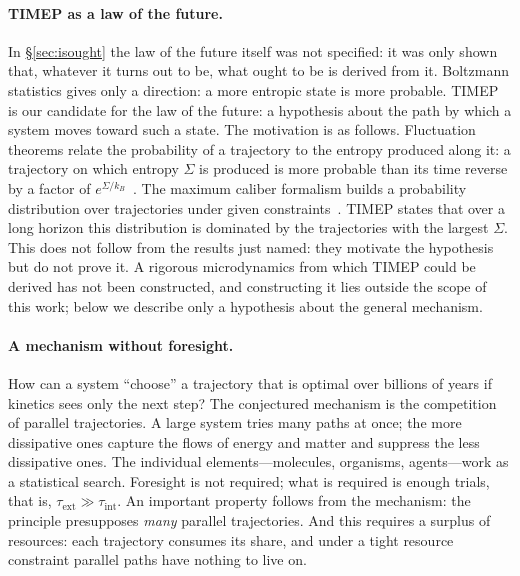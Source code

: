 \documentclass[11pt,a4paper]{article}
\newcommand{\Sref}[1]{\hyperref[#1]{\S\ref{#1}}}
\begin{document}
\paragraph{TIMEP as a law of the future.}
In \Sref{sec:isought} the law of the future itself was not specified: it was only shown that, whatever it turns out to be, what ought to be is derived from it. Boltzmann statistics gives only a direction: a more entropic state is more probable. TIMEP is our candidate for the law of the future: a hypothesis about the path by which a system moves toward such a state. The motivation is as follows. Fluctuation theorems relate the probability of a trajectory to the entropy produced along it: a trajectory on which entropy $\Sigma$ is produced is more probable than its time reverse by a factor of $e^{\Sigma/k_B}$~\cite{crooks1999,seifert2012}. The maximum caliber formalism builds a probability distribution over trajectories under given constraints~\cite{ghosh2020}. TIMEP states that over a long horizon this distribution is dominated by the trajectories with the largest $\Sigma$. This does not follow from the results just named: they motivate the hypothesis but do not prove it. A rigorous microdynamics from which TIMEP could be derived has not been constructed, and constructing it lies outside the scope of this work; below we describe only a hypothesis about the general mechanism.

\paragraph{A mechanism without foresight.}
How can a system ``choose'' a trajectory that is optimal over billions of years if kinetics sees only the next step? The conjectured mechanism is the competition of parallel trajectories. A large system tries many paths at once; the more dissipative ones capture the flows of energy and matter and suppress the less dissipative ones. The individual elements---molecules, organisms, agents---work as a statistical search. Foresight is not required; what is required is enough trials, that is, $\tau_{\mathrm{ext}}\gg\tau_{\mathrm{int}}$. An important property follows from the mechanism: the principle presupposes \emph{many} parallel trajectories. And this requires a surplus of resources: each trajectory consumes its share, and under a tight resource constraint parallel paths have nothing to live on.
\end{document}
